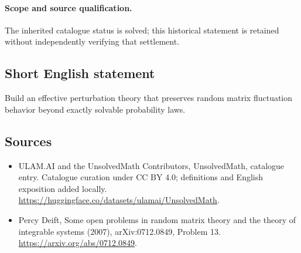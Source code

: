 \documentclass[11pt]{article}
\begin{document}
\paragraph{Scope and source qualification.}The inherited catalogue status is solved; this historical statement is retained without independently verifying that settlement.
\subsection{Short English statement}
Build an effective perturbation theory that preserves random matrix fluctuation behavior beyond exactly solvable probability laws.
\subsection{Sources}
\begin{itemize}
\item[\hypertarget{source:statement:1}{S1}] ULAM.AI and the UnsolvedMath Contributors, UnsolvedMath, catalogue entry. Catalogue curation under CC BY 4.0; definitions and English exposition added locally.
\url{https://huggingface.co/datasets/ulamai/UnsolvedMath}.
\item[\hypertarget{source:statement:2}{S2}] Percy Deift, Some open problems in random matrix theory and the theory of integrable systems (2007), arXiv:0712.0849, Problem 13.
\url{https://arxiv.org/abs/0712.0849}.
\end{itemize}
\label{end:statement}
\end{document}
